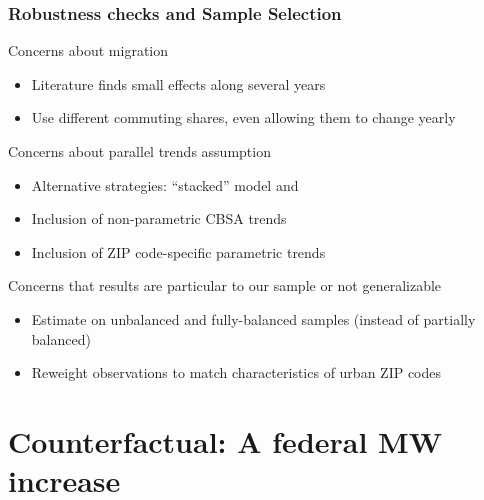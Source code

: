 \documentclass[aspectratio=169, t]{beamer}
\begin{document}
\begin{frame}[label = robustness]
    \frametitle{Robustness checks and Sample Selection}

    Concerns about migration
    \begin{itemize}
        \item Literature finds small effects along several years {\small\color{gray}\parencite[e.g.,][]{PerezPerez2021}}
        \item Use different commuting shares, even allowing them to change yearly
        
    \end{itemize}

    \vspace{1.5mm}
    Concerns about parallel trends assumption
    \begin{itemize}
        \item Alternative strategies: ``stacked'' model and \textcite{ArellanoBond1991}
        \item Inclusion of non-parametric CBSA trends
        \item Inclusion of ZIP code-specific parametric trends
    \end{itemize}

    \vspace{1.5mm}
    Concerns that results are particular to our sample or not generalizable
    \begin{itemize}
        \item Estimate on unbalanced and fully-balanced samples (instead of partially balanced)
        \item Reweight observations to match characteristics of urban ZIP codes
        
        \hyperlink{robustness_sample}{}
    \end{itemize}
    
\end{frame}

\section{Counterfactual: A federal MW increase}
\end{document}
